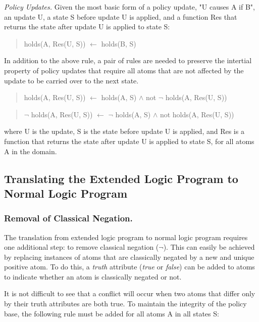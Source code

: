 \documentclass{llncs}
\begin{document}
        \emph{Policy Updates.} Given the most basic form of a policy update,
        "U causes A if B", an update U, a state S before update U is applied,
        and a function Res that returns the state after update U is applied
        to state S:

        \begin{quote}
          holds(A, Res(U, S)) $\leftarrow$ holds(B, S)
        \end{quote}
 
        In addition to the above rule, a pair of rules are needed to preserve
        the intertial property of policy updates that require all atoms that
        are not affected by the update to be carried over to the next state.

        \begin{quote}
          holds(A, Res(U, S)) $\leftarrow$ holds(A, S) $\land$ not $\lnot$
          holds(A, Res(U, S))
        \end{quote}
        \begin{quote}
          $\lnot$ holds(A, Res(U, S)) $\leftarrow$ $\lnot$ holds(A, S) $\land$
          not holds(A, Res(U, S))
        \end{quote}

        where U is the update, S is the state before update U is applied, and 
        Res is a function that returns the state after update U is applied to
        state S, for all atoms A in the domain.

    \subsection{Translating the Extended Logic Program to Normal Logic Program}

      \subsubsection{Removal of Classical Negation.}

        The translation from extended logic program to normal logic program
        requires one additional step: to remove classical negation ($\lnot$).
        This can easily be achieved by replacing instances of atoms that are
        classically negated by a new and unique positive atom. To do this,
        a \emph{truth} attribute (\emph{true} or \emph{false}) can be added to
        atoms to indicate whether an atom is classically negated or not.

        It is not difficult to see that a conflict will occur when two atoms
        that differ only by their truth attributes are both true. To maintain
        the integrity of the policy base, the following rule must be added 
        for all atoms A in all states S:
\end{document}
